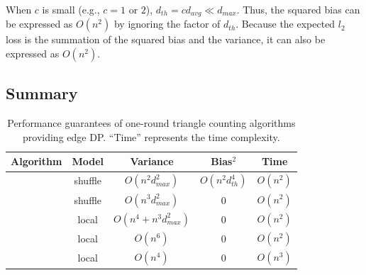When $c$ is small (e.g., $c=1$ or $2$), $d_{th} = c d_{avg} \ll d_{max}$. 
Thus, the squared bias can be expressed as $O(n^2)$ by ignoring the factor of $d_{th}$. 
Because the expected $l_2$ loss is the summation of the squared bias and the variance, it can also be expressed as $O(n^2)$. 

\subsection{Summary}
\label{sub:summary}


\begin{table}[t]
  \centering
  \begin{tabular}{|l|c|c|c|c|}
    \hline
    Algorithm & Model & Variance & Bias$^2$ & Time \\ \hline
    \AlgWSTriVR{} & shuffle & $O(n^2 d_{max}^2)$ & $O(n^2 d_{th}^4)$ & $O(n^2)$ \\ \hline
    \AlgWSTri{} & shuffle & $O(n^3 d_{max}^2)$ & $0$ & $O(n^2)$ \\ \hline
    \AlgWLTri{} & local & $O(n^4 + n^3 d_{max}^2)$ & $0$ & $O(n^2)$ \\ \hline
    \AlgARRTri{} \cite{Imola_USENIX22} & local & $O(n^6)$ & $0$ & $O(n^2)$ \\ \hline
    \AlgRRTri{} \cite{Imola_USENIX21} & local & $O(n^4)$ & $0$ & $O(n^3)$ \\ \hline
  \end{tabular}
  \caption{Performance guarantees 
  of one-round triangle counting algorithms providing edge DP. 
  ``Time'' represents the time complexity. 
  }
  \label{tab:upper_bounds_triangle}
\end{table}

